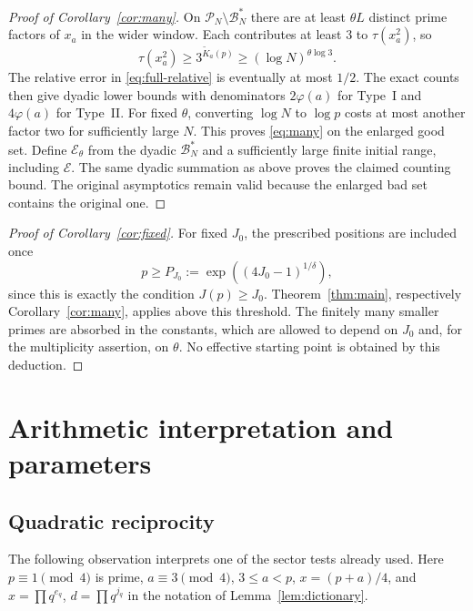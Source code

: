 \documentclass[11pt]{article}
\theoremstyle{remark}\newtheorem{remark}[theorem]{Remark}
\newcommand{\cP}{\mathcal P}
\newcommand{\cB}{\mathcal B}
\begin{document}
\begin{proof}[Proof of Corollary~\ref{cor:many}]
On $\cP_N\setminus\cB_N^*$ there are at least $\theta L$ distinct
prime factors of $x_a$ in the wider window. Each contributes at least
$3$ to $\tau(x_a^2)$, so
\[
 \tau(x_a^2)\ge3^{\widetilde K_a(p)}
                 \ge(\log N)^{\theta\log3}.
\]
The relative error in \eqref{eq:full-relative} is eventually at most
$1/2$. The exact counts then give dyadic lower bounds with denominators
$2\varphi(a)$ for Type~I and $4\varphi(a)$ for Type~II.
For fixed $\theta$, converting $\log N$ to $\log p$ costs at most
another factor two for sufficiently large $N$. This proves
\eqref{eq:many} on the enlarged good set. Define $\mathcal E_\theta$
from the dyadic $\cB_N^*$ and a sufficiently large finite initial range,
including $\mathcal E$. The same dyadic summation as above proves the
claimed counting bound. The original asymptotics remain valid because
the enlarged bad set contains the original one.
\end{proof}

\begin{proof}[Proof of Corollary~\ref{cor:fixed}]
For fixed $J_0$, the prescribed positions are included once
\[
 p\ge P_{J_0}:=\exp((4J_0-1)^{1/\delta}),
\]
since this is exactly the condition $J(p)\ge J_0$.
Theorem~\ref{thm:main}, respectively Corollary~\ref{cor:many}, applies
above this threshold. The finitely many smaller primes are absorbed
in the constants, which are allowed to depend on $J_0$ and, for the
multiplicity assertion, on $\theta$. No effective starting point is
obtained by this deduction.
\end{proof}

\section{Arithmetic interpretation and parameters}
\subsection{Quadratic reciprocity}
The following observation interprets one of the sector tests already
used. Here $p\equiv1\pmod4$ is prime, $a\equiv3\pmod4$,
$3\le a<p$, $x=(p+a)/4$, and $x=\prod q^{e_q}$,
$d=\prod q^{j_q}$ in the notation of Lemma~\ref{lem:dictionary}.
\end{document}
